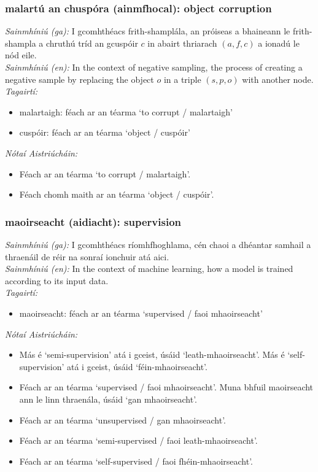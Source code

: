 \subsubsection*{malartú an chuspóra (ainmfhocal): object corruption}
 \noindent \textit{Sainmhíniú (ga):} I gcomhthéacs frith-shamplála, an próiseas a bhaineann le frith-shampla a chruthú tríd an gcuspóir $c$ in abairt thriarach $(a,f,c)$ a ionadú le nód eile.
\\
 \noindent \textit{Sainmhíniú (en):} In the context of negative sampling, the process of creating a negative sample by replacing the object $o$ in a triple $(s,p,o)$ with another node.
\\
 \noindent \textit{Tagairtí:}
\begin{itemize}
	\item malartaigh: féach ar an téarma `to corrupt / malartaigh'
	\item cuspóir: féach ar an téarma `object / cuspóir'
\end{itemize}

 \noindent \textit{Nótaí Aistriúcháin:}
\begin{itemize}
	\item Féach ar an téarma `to corrupt / malartaigh'.
	\item Féach chomh maith ar an téarma `object / cuspóir'.
\end{itemize}


\subsubsection*{maoirseacht (aidiacht): supervision}
 \noindent \textit{Sainmhíniú (ga):} I gcomhthéacs ríomhfhoghlama, cén chaoi a dhéantar samhail a thraenáil de réir na sonraí ionchuir atá aici.
\\
 \noindent \textit{Sainmhíniú (en):} In the context of machine learning, how a model is trained according to its input data.
\\
 \noindent \textit{Tagairtí:}
\begin{itemize}
	\item maoirseacht: féach ar an téarma `supervised / faoi mhaoirseacht'
\end{itemize}

 \noindent \textit{Nótaí Aistriúcháin:}
\begin{itemize}
	\item Más é `semi-supervision' atá i gceist, úsáid `leath-mhaoirseacht'. Más é `self-supervision' atá i gceist, úsáid `féin-mhaoirseacht'.
	\item Féach ar an téarma `supervised / faoi mhaoirseacht'. Muna bhfuil maoirseacht ann le linn thraenála, úsáid `gan mhaoirseacht'.
	\item Féach ar an téarma `unsupervised / gan mhaoirseacht'.
	\item Féach ar an téarma `semi-supervised / faoi leath-mhaoirseacht'.
	\item Féach ar an téarma `self-supervised / faoi fhéin-mhaoirseacht'.
\end{itemize}


